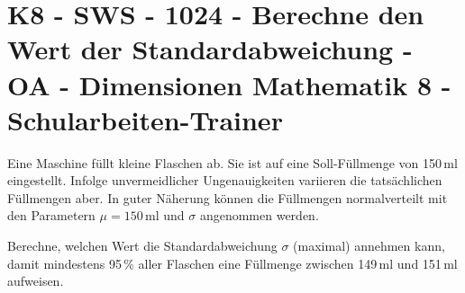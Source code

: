 \section{K8 - SWS - 1024 - Berechne den Wert der Standardabweichung - OA - Dimensionen Mathematik 8 - Schularbeiten-Trainer}

\begin{beispiel}[K8 - SWS]{1}
Eine Maschine füllt kleine Flaschen ab. Sie ist auf eine Soll-Füllmenge von 150\,ml eingestellt. Infolge unvermeidlicher Ungenauigkeiten variieren die tatsächlichen Füllmengen aber. In guter Näherung können die Füllmengen normalverteilt mit den Parametern $\mu=150$\,ml und $\sigma$ angenommen werden.

Berechne, welchen Wert die Standardabweichung $\sigma$ (maximal) annehmen kann, damit mindestens 95\,\% aller Flaschen eine Füllmenge zwischen 149\,ml und 151\,ml aufweisen.

\end{beispiel}